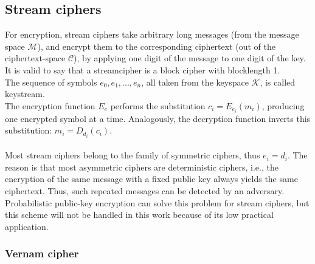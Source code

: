 \subsection{Stream ciphers}
For encryption, stream ciphers take arbitrary long messages (from the message space $\mathcal{M}$), and encrypt
them to the corresponding ciphertext (out of the ciphertext-space $\mathcal{C}$), by applying
one digit of the message to one digit of the key. It is valid to say that a streamcipher is a block cipher with blocklength 1.
\\ 
The sequence of symbols $e_0, e_1, ..., e_n$, all taken from the keyspace $\mathcal{K}$, is called keystream.
\\
The encryption function $E_e$ performs the substitution $c_i = E_{e_i}(m_i)$, producing one encrypted symbol at a time. Analogously,
the decryption function inverts this substitution: $m_i = D_{d_i}(c_i)$.
\\
\\
Most stream ciphers belong to the family of symmetric ciphers, thus $e_i = d_i$. The reason is that most asymmetric ciphers are deterministic ciphers,
i.e., the encryption of the same message with a fixed public key always yields the same ciphertext. Thus, such repeated messages can be detected by 
an adversary. 
Probabilistic public-key encryption can solve this problem for stream ciphers,
but this scheme will not be handled in this work because of its low practical application.
\subsubsection{Vernam cipher} 

